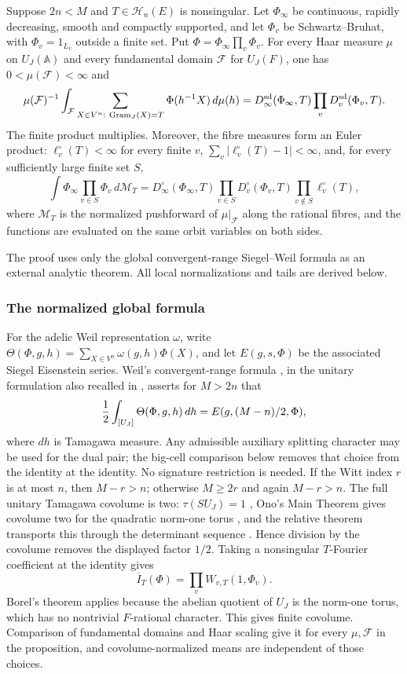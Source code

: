 \begin{proposition}\label{prop:normalized-unitary-sw}
Suppose $2n<M$ and $T\in\mathcal H_n(E)$ is nonsingular. Let $\Phi_\infty$ be continuous, rapidly decreasing, smooth and compactly supported, and let $\Phi_v$ be Schwartz--Bruhat, with $\Phi_v=1_{L_v}$ outside a finite set. Put $\Phi=\Phi_\infty\prod_v\Phi_v$. For every Haar measure $\mu$ on $U_J(\mathbb A)$ and every fundamental domain $\mathcal F$ for $U_J(F)$, one has $0<\mu(\mathcal F)<\infty$ and
\[
 \mu(\mathcal F)^{-1}\int_{\mathcal F}
 \sum_{X\in V^n:\ \operatorname{Gram}_J(X)=T}\Phi(h^{-1}X)\,d\mu(h)
 =D_\infty^{\rm sd}(\Phi_\infty,T)\prod_vD_v^{\rm sd}(\Phi_v,T).
\]
The finite product multiplies. Moreover, the fibre measures form an Euler product: $\ell_v^\circ(T)<\infty$ for every finite $v$, $\sum_v|\ell_v^\circ(T)-1|<\infty$, and, for every sufficiently large finite set $S$,
\[
 \int\Phi_\infty\prod_{v\in S}\Phi_v\,d\mathcal M_T
 =D_\infty^\circ(\Phi_\infty,T)\prod_{v\in S}D_v^\circ(\Phi_v,T)
 \prod_{v\notin S}\ell_v^\circ(T),
\]
where $\mathcal M_T$ is the normalized pushforward of $\mu|_{\mathcal F}$ along the rational fibres, and the functions are evaluated on the same orbit variables on both sides.
\end{proposition}

The proof uses only the global convergent-range Siegel--Weil formula as an external analytic theorem. All local normalizations and tails are derived below.

\subsubsection{The normalized global formula}

For the adelic Weil representation $\omega$, write
$\Theta(\Phi,g,h)=\sum_{X\in V^n}\omega(g,h)\Phi(X)$, and let $E(g,s,\Phi)$ be the associated Siegel Eisenstein series. Weil's convergent-range formula \cite[Theorem 5]{Weil1965}, in the unitary formulation also recalled in \cite[Theorem 2.3.1]{LiTheta}, asserts for $M>2n$ that
\[
 {1\over2}\int_{[U_J]}\Theta(\Phi,g,h)\,dh=E(g,(M-n)/2,\Phi),
\]
where $dh$ is Tamagawa measure. Any admissible auxiliary splitting character may be used for the dual pair; the big-cell comparison below removes that choice from the identity at the identity. No signature restriction is needed. If the Witt index $r$ is at most $n$, then $M-r>n$; otherwise $M\ge2r$ and again $M-r>n$. The full unitary Tamagawa covolume is two: $\tau(SU_J)=1$ \cite{Mars1969}, Ono's Main Theorem gives covolume two for the quadratic norm-one torus \cite{Ono1963}, and the relative theorem transports this through the determinant sequence \cite{Ono1965,WeilAdeles}. Hence division by the covolume removes the displayed factor $1/2$. Taking a nonsingular $T$-Fourier coefficient at the identity gives
\[
 \overline I_T(\Phi)=\prod_vW_{v,T}(1,\Phi_v).
\]
Borel's theorem \cite[Theorem 5.6(i)]{borel63} applies because the abelian quotient of $U_J$ is the norm-one torus, which has no nontrivial $F$-rational character. This gives finite covolume. Comparison of fundamental domains and Haar scaling give it for every $\mu,\mathcal F$ in the proposition, and covolume-normalized means are independent of those choices.

